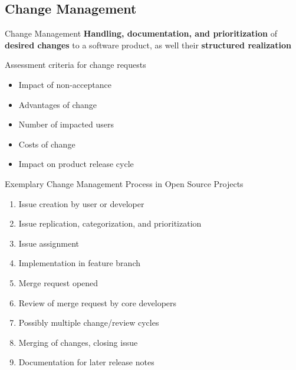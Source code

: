 \subsection{Change Management}
\begin{frame}{\insertsubsection{}  \mytitlesource{\sommerville}}
	\begin{fancycolumns}[animation=none]
		\begin{definition}{Change Management}
			\textbf{Handling, documentation, and prioritization} of \textbf{desired changes} to a software product, as well their \textbf{structured  realization}
		\end{definition}\pause

		\begin{note}{Assessment criteria for change requests}
			\begin{itemize}
				\item Impact of non-acceptance
				\item Advantages of change
				\item Number of impacted users
				\item Costs of change
				\item Impact on product release cycle
			\end{itemize}
		\end{note} \pause
		\nextcolumn
		\begin{note}{Exemplary Change Management Process in Open Source Projects}
			\begin{enumerate}[<+->]
				\item Issue creation by user or developer
				\item Issue replication, categorization, and prioritization
				\item Issue assignment
				\item Implementation in feature branch
				\item Merge request opened
				\item Review of merge request by core developers
				\item Possibly multiple change/review cycles
				\item Merging of changes, closing issue
				\item Documentation for later release notes
			\end{enumerate}
		\end{note}
	\end{fancycolumns}
\end{frame}

